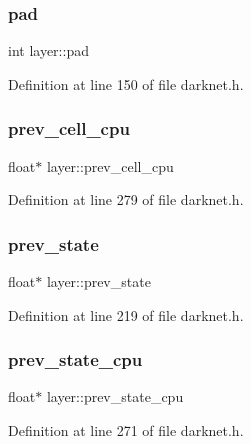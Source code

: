 \subsubsection{\texorpdfstring{pad}{pad}}
{\footnotesize\ttfamily int layer\+::pad}



Definition at line 150 of file darknet.\+h.

\mbox{\label{structlayer_a4844271cfffe336d89a934705c8e3cc9}} 
\subsubsection{\texorpdfstring{prev\_cell\_cpu}{prev\_cell\_cpu}}
{\footnotesize\ttfamily float$\ast$ layer\+::prev\+\_\+cell\+\_\+cpu}



Definition at line 279 of file darknet.\+h.

\mbox{\label{structlayer_aa82477e38a85af20ebd0300cab6ea6e1}} 
\subsubsection{\texorpdfstring{prev\_state}{prev\_state}}
{\footnotesize\ttfamily float$\ast$ layer\+::prev\+\_\+state}



Definition at line 219 of file darknet.\+h.

\mbox{\label{structlayer_afcadbe531d4b320c23877019284168b0}} 
\subsubsection{\texorpdfstring{prev\_state\_cpu}{prev\_state\_cpu}}
{\footnotesize\ttfamily float$\ast$ layer\+::prev\+\_\+state\+\_\+cpu}



Definition at line 271 of file darknet.\+h.

\mbox{\label{structlayer_a3c133867d28268532e3786ae75db47fc}} 
